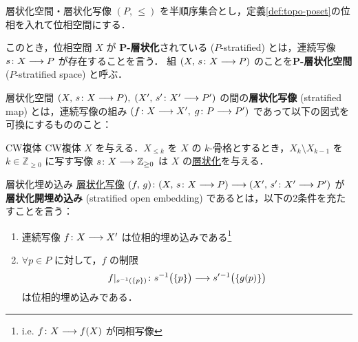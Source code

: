 \documentclass[TQFT_main]{subfiles}
\begin{document}
\begin{mydef}[label=def:stratified-space]{層状化空間・層状化写像}
    $(P,\, \le)$ を半順序集合とし，定義\ref{def:topo-poset}の位相を入れて位相空間にする．
    
    このとき，位相空間 $X$ が $\bm{P}$\textbf{-層状化}されている ($P$-stratified) とは，連続写像 $s \colon X \longrightarrow P$ が存在することを言う．
    組 $(X,\, s \colon X \longrightarrow P)$ のことを\textbf{$\bm{P}$-層状化空間} ($P$-stratified space) と呼ぶ．

    \tcblower

    層状化空間 $(X,\, s \colon X \longrightarrow P),\; (X',\, s' \colon X' \longrightarrow P')$ の間の\textbf{層状化写像} (stratified map) とは，連続写像の組み $(f \colon X \longrightarrow X',\; g \colon P \longrightarrow P')$ であって以下の図式を可換にするもののこと：
    \begin{center}
    \end{center}
\end{mydef}

\begin{myexample}[label=ex:str-CW]{CW複体}
    CW複体 $X$ を与える．$X_{\le k}$ を $X$ の $k$-骨格とするとき，$X_k \setminus X_{k-1}$ を $k \in \mathbb{Z}_{\ge 0}$ に写す写像 $s \colon X \longrightarrow \mathbb{Z}_{\ge 0}$ は $X$ の\hyperref[def:stratified-space]{層状化}を与える．
\end{myexample}


\begin{mydef}[label=def:strat-emb]{層状化埋め込み}
    \hyperref[def:stratified-space]{層状化写像} $(f,\, g) \colon (X,\, s \colon X \longrightarrow P) \longrightarrow (X',\, s' \colon X' \longrightarrow P')$ が\textbf{層状化開埋め込み} (stratified open embedding) であるとは，以下の2条件を充たすことを言う：
    \begin{enumerate}
        \item 連続写像 $f \colon X \longrightarrow X'$ は位相的埋め込みである\footnote{i.e. $f \colon X \longrightarrow f(X)$ が同相写像}
        \item $\forall p \in P$ に対して，$f$ の制限
        \begin{align}
            f|_{s^{-1}(\{p\})} \colon s^{-1} \bigl( \{p\} \bigr) \longrightarrow s'{}^{-1} \bigl( \{g(p)\} \bigr) 
        \end{align}
        は位相的埋め込みである．
    \end{enumerate}
\end{mydef}
\end{document}

